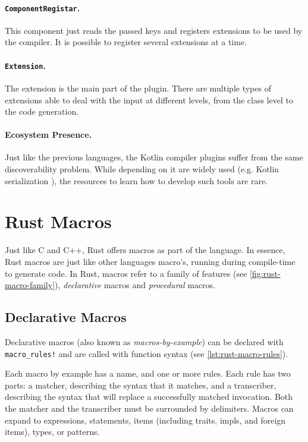 \paragraph{\texttt{ComponentRegistar}.}
This component just reads the passed keys and registers extensions to be used by the compiler.
It is possible to register several extensions at a time.

\paragraph{\texttt{Extension}.}
The extension is the main part of the plugin.
There are multiple types of extensions able to deal with the input at different levels,
from the class level to the code generation.

\paragraph{Ecosystem Presence.}
Just like the previous languages, the Kotlin compiler plugins suffer from the same discoverability problem.
While depending on it are widely used (e.g. Kotlin serialization \autocite{Kotlin2021}),
the resources to learn how to develop such tools are rare.



\section{Rust Macros}\label{sec:rust-macros}

Just like C and C++, Rust offers macros as part of the language.
In essence, Rust macros are just like other languages macro's, running during compile-time to generate code.
In Rust, macros refer to a family of features (see \autoref{fig:rust-macro-family}),
\emph{declarative} macros and \emph{procedural} macros.



\subsection{Declarative Macros}\label{sec:rust-macros:decl}

Declarative macros (also known as \emph{macros-by-example}) can be declared with \texttt{macro\_rules!}
and are called with function syntax (see \autoref{lst:rust-macro-rules}).

\begin{displayquote}
	Each macro by example has a name, and one or more rules.
	Each rule has two parts: a matcher, describing the syntax that it matches, and a transcriber,
	describing the syntax that will replace a successfully matched invocation.
	Both the matcher and the transcriber must be surrounded by delimiters.
	Macros can expand to expressions, statements, items
	(including traits, impls, and foreign items), types, or patterns.
\end{displayquote}

